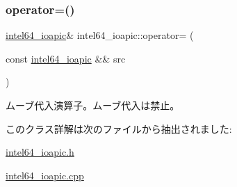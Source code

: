 \subsubsection{\texorpdfstring{operator=()}{operator=()}\hspace{0.1cm}{\footnotesize\ttfamily [2/2]}}
{\footnotesize\ttfamily \hyperlink{classintel64__ioapic}{intel64\+\_\+ioapic}\& intel64\+\_\+ioapic\+::operator= (\begin{DoxyParamCaption}\item[{const \hyperlink{classintel64__ioapic}{intel64\+\_\+ioapic} \&\&}]{src }\end{DoxyParamCaption})\hspace{0.3cm}{\ttfamily [delete]}}

ムーブ代入演算子。ムーブ代入は禁止。 

このクラス詳解は次のファイルから抽出されました\+:\begin{DoxyCompactItemize}
\item 
\hyperlink{intel64__ioapic_8h}{intel64\+\_\+ioapic.\+h}\item 
\hyperlink{intel64__ioapic_8cpp}{intel64\+\_\+ioapic.\+cpp}\end{DoxyCompactItemize}
